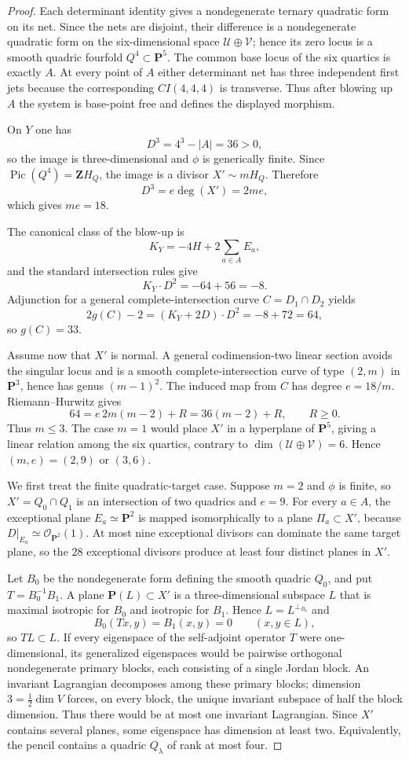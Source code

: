 \documentclass[11pt,reqno]{amsart}
\theoremstyle{remark}
\newcommand{\PP}{\mathbf P}
\newcommand{\ZZ}{\mathbf Z}
\newcommand{\cO}{\mathcal O}
\begin{document}
\begin{proof}
Each determinant identity gives a nondegenerate ternary quadratic form on its net.  Since the nets are disjoint, their difference is a nondegenerate quadratic form on the six-dimensional space $\mathcal U\oplus\mathcal V$; hence its zero locus is a smooth quadric fourfold $Q^4\subset\PP^5$.  The common base locus of the six quartics is exactly $A$.  At every point of $A$ either determinant net has three independent first jets because the corresponding $CI(4,4,4)$ is transverse.  Thus after blowing up $A$ the system is base-point free and defines the displayed morphism.

On $Y$ one has
\[
D^3=4^3-|A|=36>0,
\]
so the image is three-dimensional and $\phi$ is generically finite.  Since $\operatorname{Pic}(Q^4)=\ZZ H_Q$, the image is a divisor $X'\sim mH_Q$.  Therefore
\[
D^3=e\deg(X')=2me,
\]
which gives $me=18$.

The canonical class of the blow-up is
\[
K_Y=-4H+2\sum_{a\in A}E_a,
\]
and the standard intersection rules give
\[
K_Y\cdot D^2=-64+56=-8.
\]
Adjunction for a general complete-intersection curve $C=D_1\cap D_2$ yields
\[
2g(C)-2=(K_Y+2D)\cdot D^2=-8+72=64,
\]
so $g(C)=33$.

Assume now that $X'$ is normal.  A general codimension-two linear section avoids the singular locus and is a smooth complete-intersection curve of type $(2,m)$ in $\PP^3$, hence has genus $(m-1)^2$.  The induced map from $C$ has degree $e=18/m$.  Riemann--Hurwitz gives
\[
64=e\,2m(m-2)+R=36(m-2)+R,
\qquad R\ge0.
\]
Thus $m\le3$.  The case $m=1$ would place $X'$ in a hyperplane of $\PP^5$, giving a linear relation among the six quartics, contrary to $\dim(\mathcal U\oplus\mathcal V)=6$.  Hence $(m,e)=(2,9)$ or $(3,6)$.

We first treat the finite quadratic-target case.  Suppose $m=2$ and $\phi$ is finite, so $X'=Q_0\cap Q_1$ is an intersection of two quadrics and $e=9$.  For every $a\in A$, the exceptional plane $E_a\simeq\PP^2$ is mapped isomorphically to a plane $\Pi_a\subset X'$, because $D|_{E_a}\simeq\cO_{\PP^2}(1)$.  At most nine exceptional divisors can dominate the same target plane, so the $28$ exceptional divisors produce at least four distinct planes in $X'$.

Let $B_0$ be the nondegenerate form defining the smooth quadric $Q_0$, and put $T=B_0^{-1}B_1$.  A plane $\PP(L)\subset X'$ is a three-dimensional subspace $L$ that is maximal isotropic for $B_0$ and isotropic for $B_1$.  Hence $L=L^{\perp_{B_0}}$ and
\[
B_0(Tx,y)=B_1(x,y)=0\qquad(x,y\in L),
\]
so $TL\subset L$.  If every eigenspace of the self-adjoint operator $T$ were one-dimensional, its generalized eigenspaces would be pairwise orthogonal nondegenerate primary blocks, each consisting of a single Jordan block.  An invariant Lagrangian decomposes among these primary blocks; dimension $3=\frac12\dim V$ forces, on every block, the unique invariant subspace of half the block dimension.  Thus there would be at most one invariant Lagrangian.  Since $X'$ contains several planes, some eigenspace has dimension at least two.  Equivalently, the pencil contains a quadric $Q_\lambda$ of rank at most four.


\end{proof}
\end{document}
